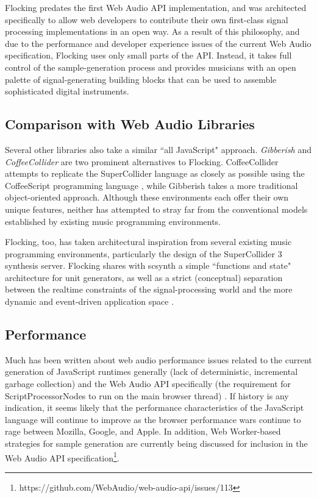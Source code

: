 \documentclass{article}
\begin{document}
Flocking predates the first Web Audio API implementation, and was architected specifically to allow web developers to contribute their own first-class signal processing implementations in an open way. As a result of this philosophy, and due to the performance and developer experience issues of the current Web Audio specification, Flocking uses only small parts of the API. Instead, it takes full control of the sample-generation process and provides musicians with an open palette of signal-generating building blocks that can be used to assemble sophisticated digital instruments.

\subsection{Comparison with Web Audio Libraries}

Several other libraries also take a similar ``all JavaScript" approach. {\it Gibberish} \cite{roberts_web_2013} and {\it CoffeeCollider} \cite{Mohayonao} are two prominent alternatives to Flocking. CoffeeCollider attempts to replicate the SuperCollider language as closely as possible using the CoffeeScript programming language \cite{Ashkenas}, while Gibberish takes a more traditional object-oriented approach. Although these environments each offer their own unique features, neither has attempted to stray far from the conventional models established by existing music programming environments.

Flocking, too, has taken architectural inspiration from several existing music programming environments, particularly the design of the SuperCollider 3 synthesis server. Flocking shares with scsynth a simple ``functions and state" architecture for unit generators, as well as a strict (conceptual) separation between the realtime constraints of the signal-processing world and the more dynamic and event-driven application space \cite[pp. 64]{mccartney2002rethinking}.

\subsection{Performance}

Much has been written about web audio performance issues related to the current generation of JavaScript runtimes generally (lack of deterministic, incremental garbage collection) and the Web Audio API specifically (the requirement for ScriptProcessorNodes to run on the main browser thread) \cite{DBLP:journals/comj/WyseS13,roberts_web_2013}. If history is any indication, it seems likely that the performance characteristics of the JavaScript language will continue to improve as the browser performance wars continue to rage between Mozilla, Google, and Apple. In addition, Web Worker-based strategies for sample generation are currently being discussed for inclusion in the Web Audio API specification\footnote{https://github.com/WebAudio/web-audio-api/issues/113}.
\end{document}
